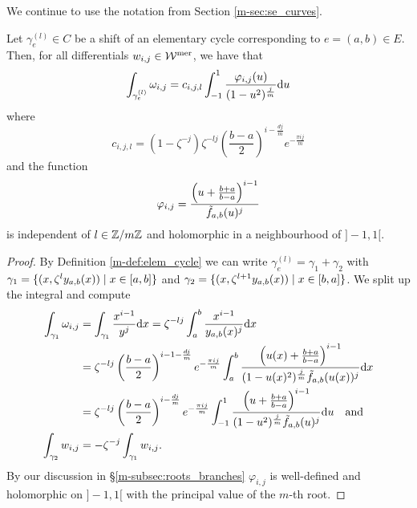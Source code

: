 \documentclass[main.tex]{subfiles}
\begin{document}
  We continue to use the notation from Section \ref{m-sec:se_curves}.

  \begin{thm}\label{thm:periods}
   Let $\gamma_e^{(l)} \in C$ be a shift of an elementary cycle corresponding to $e = (a,b) \in E$. Then, for all differentials $w_{i,j} \in \mathcal{W}^{\text{mer}}$, we have that
   \begin{equation}
      \label{eq:thm_periods_1} 
      \int_{\gamma_e^{(l)}} \omega_{i,j}  =  c_{i,j,l} \int_{-1}^1 \frac{\varphi_{i,j}(u)}{(1-u^2)^{\frac{j}{m}}}  \mathrm d u
   \end{equation}
   where
   \begin{equation}
    c_{i,j,l}   =  (1-\zeta^{-j})  \zeta^{-lj} \left(\frac{b-a}{2}\right)^{i-\frac{dj}{m}} e^{-\frac{\pi i j}{m}}
   \end{equation}
   and the function
   \begin{equation}
    \varphi_{i,j}  = \frac{\left(u+\frac{b+a}{b-a}\right)^{i-1}}{\tilde{f}_{a,b}(u)^j}
   \end{equation}
   is independent of $l\in\mathbb{Z}/m\mathbb{Z}$ and holomorphic in a neighbourhood of
   $]\!-1,1[$.
  \end{thm}
  \begin{proof}
    By Definition \ref{m-def:elem_cycle} we can write $\gamma_e^{(l)} = \gamma_1 + \gamma_2$ with $\gamma_1 = \{  (x,\zeta^l y_{a,b}(x))  \mid  x \in [a,b]  \}$ and
    $\gamma_2 = \{  (x,\zeta^{l+1}y_{a,b}(x))  \mid  x \in [b,a]  \}$. We split up the integral and compute
    \begin{align}\label{eq:thm_periods_2}
    \begin{split}
     \int_{\gamma_1} \omega_{i,j}  & =  \int_{\gamma_1} \frac{x^{i-1}}{y^j}  \mathrm d x  =  \zeta^{-lj} \int_a^b \frac{x^{i-1}}{y_{a,b}(x)^j}  \mathrm d x \\  & = 
     \zeta^{-lj} \left(\frac{b-a}{2}\right)^{i-1-\frac{dj}{m}} e^{-\frac{\pi i j}{m}}
     \int_a^b \frac{\left(u(x)+\frac{b+a}{b-a}\right)^{i-1}}{(1-u(x)^2)^{\frac{j}{m}}\tilde{f}_{a,b}(u(x))^j}  \mathrm d x \\
      & =    \zeta^{-lj} \left(\frac{b-a}{2}\right)^{i-\frac{dj}{m}} e^{-\frac{\pi i j}{m}}
     \int_{-1}^1 \frac{\left(u+\frac{b+a}{b-a}\right)^{i-1}}{(1-u^2)^{\frac{j}{m}}\tilde{f}_{a,b}(u)^j}  \mathrm d u \quad \text{and} \\
    \int_{\gamma_2} w_{i,j}  & =  - \zeta^{-j} \int_{\gamma_1} w_{i,j}.
    \end{split}
  \end{align}
  By our discussion in \S \ref{m-subsec:roots_branches} $\varphi_{i,j}$ is well-defined and holomorphic on $]-1,1[$ with the principal value of the $m$-th root.
  \end{proof}
\end{document}
